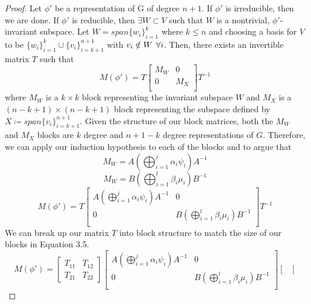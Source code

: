 \begin{proof}
Let $\phi'$ be a representation of G of degree $n+1$. If $\phi'$ is irreducible, then we are done. If $\phi'$ is reducible, then $\exists W \subset V$ such that $W$ is a nontrivial, $\phi'$-invariant subspace. Let $W = span\{w_i\}_{i=1}^k$ where $k\leq n$ and choosing a basis for $V$ to be $\{w_i\}_{i=1}^k \cup \{v_i\}_{i=k+1}^{n+1}$ with $v_i \notin W \hspace{1.5mm} \forall i$. Then, there exists an invertible matrix $T$ such that
\begin{equation}
	M(\phi') = T\begin{bmatrix}
					M_W& 0\\
					0 & M_{X}\\
					\end{bmatrix}T^{-1}
\end{equation}
where $M_W$ is a $k\times k$ block representing the invariant subspace $W$ and $M_{X}$ is a $(n-k+1)\times (n-k+1)$ block representing the subspace defined by $X \coloneq span\{v_i\}_{i=k+1}^{n+1}$. Given the structure of our block matrices, both the $M_W$ and $M_X$ blocks are $k$ degree and $n+1-k$ degree representations of $G$. Therefore, we can apply our induction hypothesis to each of the blocks and to argue that 
$$M_W = A\left(\bigoplus_{i=1}^j \alpha_i\psi_i \right)A^{-1}$$
$$M_W = B\left(\bigoplus_{i=1}^{l} \beta_i\mu_i  \right)B^{-1}$$
\begin{equation}
	M(\phi') = T\begin{bmatrix}
					A\left(\bigoplus_{i=1}^j \alpha_i\psi_i \right)A^{-1}& 0\\
					0 &  B\left(\bigoplus_{i=1}^{l} \beta_i\mu_i  \right)B^{-1}\\
					\end{bmatrix}T^{-1}
\end{equation}
We can break up our matrix $T$ into block structure to match the size of our blocks in Equation 3.5.
\begin{equation}
	M(\phi') =  \begin{bmatrix}
					T_{11} & T_{12} \\
					T_{21} & T_{22}
				\end{bmatrix}
				\begin{bmatrix}
					A\left(\bigoplus_{i=1}^j \alpha_i\psi_i \right)A^{-1}& 0\\
					0 &  B\left(\bigoplus_{i=1}^{l} \beta_i\mu_i  \right)B^{-1}\\
				\end{bmatrix}
				\begin{bmatrix}

\end{bmatrix}
\end{equation}
\end{proof}
